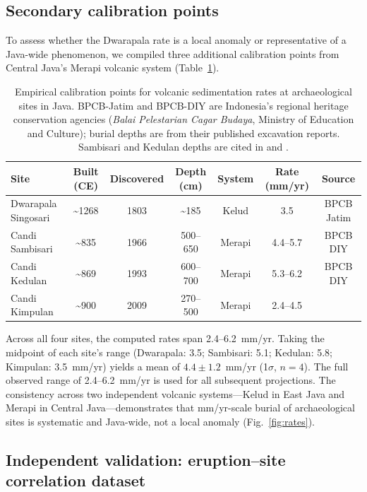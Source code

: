 \documentclass[12pt,a4paper]{article}
\begin{document}
\subsection{Secondary calibration points}

To assess whether the Dwarapala rate is a local anomaly or representative of a Java-wide phenomenon, we compiled three additional calibration points from Central Java's Merapi volcanic system (Table~\ref{tab:calibration}).

\begin{table}[t]
\caption{Empirical calibration points for volcanic sedimentation rates at archaeological sites in Java. BPCB-Jatim and BPCB-DIY are Indonesia's regional heritage conservation agencies (\textit{Balai Pelestarian Cagar Budaya}, Ministry of Education and Culture); burial depths are from their published excavation reports. Sambisari and Kedulan depths are cited in \citet{lavigne2000} and \citet{thouret2000}.}
\label{tab:calibration}
\begin{tabular}{lcccccc}
\toprule
Site & Built (CE) & Discovered & Depth (cm) & System & Rate (mm/yr) & Source \\
\midrule
Dwarapala Singosari & \textasciitilde1268 & 1803 & \textasciitilde185 & Kelud & 3.5 & BPCB Jatim \\
Candi Sambisari & \textasciitilde835 & 1966 & 500--650 & Merapi & 4.4--5.7 & BPCB DIY \\
Candi Kedulan & \textasciitilde869 & 1993 & 600--700 & Merapi & 5.3--6.2 & BPCB DIY \\
Candi Kimpulan & \textasciitilde900 & 2009 & 270--500 & Merapi & 2.4--4.5 & \citet{putra2019} \\
\bottomrule
\end{tabular}
\end{table}

Across all four sites, the computed rates span 2.4--6.2~mm/yr. Taking the midpoint of each site's range (Dwarapala: 3.5; Sambisari: 5.1; Kedulan: 5.8; Kimpulan: 3.5~mm/yr) yields a mean of $4.4 \pm 1.2$~mm/yr (1$\sigma$, $n=4$). The full observed range of 2.4--6.2~mm/yr is used for all subsequent projections. The consistency across two independent volcanic systems---Kelud in East Java and Merapi in Central Java---demonstrates that mm/yr-scale burial of archaeological sites is systematic and Java-wide, not a local anomaly (Fig.~\ref{fig:rates}).

\subsection{Independent validation: eruption--site correlation dataset}
\end{document}
